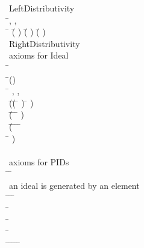 \begin{hetcasl}
\> {\small{}\KW{\%\%}Left\Ax{\_}Distributivity}\\
\> \Ax{\forall} \=, ,  \Ax{:}  \\
\> \Ax{\bullet} \= \Ax{*} (\= \Ax{+} ) \Ax{=} \=(\= \Ax{*} ) \Ax{+} (\= \Ax{*} )\\
\> {\small{}\KW{\%\%}Right\Ax{\_}Distributivity}\\
\> {\small{}\KW{\%\%}axioms for Ideal}\\
\> \Ax{\forall} \= \Ax{:}  \\
\> \Ax{\bullet} \=() \\
\>\> \Ax{\Leftrightarrow} \=\Ax{\forall} , ,  \Ax{:}  \\
\>\>\> \Ax{\bullet} \=(\=(\=   \Ax{\Rightarrow} \=  ) \Ax{\wedge} \=  ) \\
\>\>\>\> \Ax{\wedge} (\=   \Ax{\wedge} \=   \Ax{\Rightarrow} \= \Ax{*}   ) \\
\>\>\>\> \Ax{\wedge} (\=   \Ax{\wedge} \=   \Ax{\wedge} \=   \Ax{\wedge} \= \Ax{+}  \Ax{=}  \\
\>\>\>\>\> \Ax{\Rightarrow} \= \Ax{+}   )\\
\> \\
\> {\small{}\KW{\%\%}axioms for PID\Ax{-}s}\\
\> \PRED \=\Ax{\_\_}\Ax{\_\_} \Ax{:} \= \Ax{\times} \\
\>\> {\small{}\KW{\%\%}an ideal is generated by an element}\\
\> \Ax{\forall} \= \Ax{:}  \Ax{\bullet} \=\Ax{\exists}  \Ax{:}  \Ax{\bullet} \=  \\
\> \Ax{\forall} \= \Ax{:}  \\
\> \Ax{\bullet} \=\Ax{\forall}  \Ax{:}  \\
\>\> \Ax{\bullet} \=   \\
\>\>\> \Ax{\Leftrightarrow} \=\Ax{\forall}  \Ax{:}  \Ax{\bullet} \=   \Ax{\Rightarrow} \=\Ax{\exists}  \Ax{:}  \Ax{\bullet} \= \Ax{=} \= \Ax{*} \\

\end{hetcasl}
